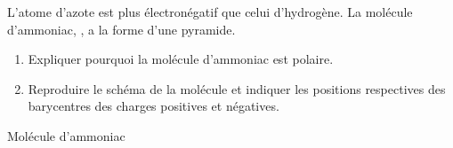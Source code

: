 \begin{minipage}{0.74\linewidth}
    L'atome d'azote est plus électronégatif que celui d'hydrogène. La molécule
    d'ammoniac, , a la forme d'une pyramide.

    \begin{enumerate}
        \item Expliquer pourquoi la molécule d'ammoniac est polaire.
        \item Reproduire le schéma de la molécule et indiquer les positions
              respectives des barycentres des charges positives et négatives.
    \end{enumerate}
\end{minipage}
\hfill
\begin{minipage}{0.24\linewidth}
\begin{center}
    {Molécule d'ammoniac}
\end{center}
\end{minipage}
